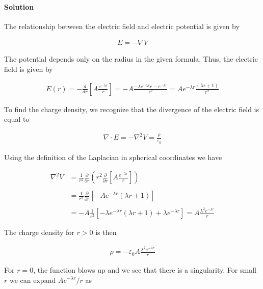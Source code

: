 \documentclass{article}
\begin{document}
\paragraph{Solution}

The relationship between the electric field and electric potential is given by 

\begin{align*}
    E = -\nabla V
\end{align*}

The potential depends only on the radius in the given formula. Thus, the electric field is given by 

\begin{align*}
    E(r) = -\frac{d}{dr}\left[ A\frac{e^{-\lambda r}}{r} \right] = -A\frac{-\lambda e^{-\lambda r}r - e^{-\lambda r}}{r^2} = Ae^{-\lambda r}\frac{(\lambda r + 1)}{r^2}
\end{align*}

To find the charge density, we recognize that the divergence of the electric field is equal to 

\begin{align*}
    \nabla \cdot E = - \nabla^2V = \frac{\rho}{\varepsilon_0}
\end{align*}

Using the definition of the Laplacian in spherical coordinates we have 

\begin{align*}
    \nabla^2 V &= \frac{1}{r^2}\frac{\partial}{\partial r}\left(r^2 \frac{\partial}{\partial r} \left[ A\frac{e^{-\lambda r}}{r} \right]\right) \\
    \\ 
    &= \frac{1}{r^2}\frac{\partial }{\partial r}\left[  -Ae^{-\lambda r}(\lambda r + 1)\right] \\
    \\
    &= -A \frac{1}{r^2}\left[ -\lambda e^{-\lambda r}(\lambda r + 1) + \lambda e^{-\lambda r}  \right] = A\frac{\lambda^2e^{-\lambda r}}{r}
\end{align*}

\pagebreak

The charge density for $r > 0 $ is then 

\begin{align*}
    \rho = -\varepsilon_0A\frac{\lambda^2e^{-\lambda r}}{r}
\end{align*}

For $r = 0$, the function blows up and we see that there is a singularity. For small $r$ we can expand $Ae^{-\lambda r}/r$ as 
\end{document}
